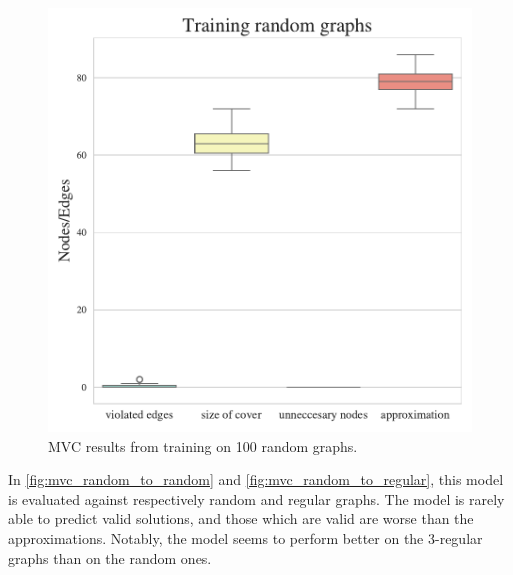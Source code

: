 \begin{figure}[h]
    \centering
    \includegraphics[width=\linewidth]{Project2TSP/_src/figures/mvc_train_random.pdf}
    \caption{MVC results from training on 100 random graphs.}
    \label{fig:mvc_train_random}
\end{figure}

In \autoref{fig:mvc_random_to_random} and \autoref{fig:mvc_random_to_regular}, this model is evaluated against respectively random and regular graphs.
The model is rarely able to predict valid solutions, and those which are valid are worse than the approximations.
Notably, the model seems to perform better on the $3$-regular graphs than on the random ones.

